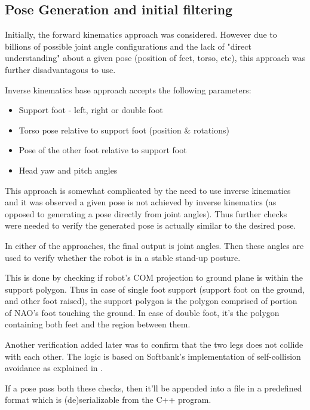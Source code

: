 \documentclass[english, printversion, nomenclature, notitle]{tuvisionthesis} %
\begin{document}
\subsection{Pose Generation and initial filtering}

Initially, the forward kinematics approach was considered. However due to billions of possible joint angle configurations and the lack of "direct understanding" about a given pose (position of feet, torso, etc), this approach was further disadvantagous to use.

Inverse kinematics base approach accepts the following parameters:
\begin{itemize}
	\item Support foot - left, right or double foot
	\item Torso pose relative to support foot (position \& rotations)
	\item Pose of the other foot relative to support foot
	\item Head yaw and pitch angles
\end{itemize}
This approach is somewhat complicated by the need to use inverse kinematics and it was observed a given pose is not achieved by inverse kinematics (as opposed to generating a pose directly from joint angles). Thus further checks were needed to verify the generated pose is actually similar to the desired pose.

In either of the approaches, the final output is joint angles. Then these angles are used to verify whether the robot is in a stable stand-up posture.

This is done by checking if robot's COM projection to ground plane is within the support polygon. Thus in case of single foot support (support foot on the ground, and other foot raised), the support polygon is the polygon comprised of portion of NAO's foot touching the ground. In case of double foot, it's the polygon containing both feet and the region between them. 

Another verification added later was to confirm that the two legs does not collide with each other. The logic is based on Softbank's implementation of self-collision avoidance as explained in .

If a pose pass both these checks, then it'll be appended into a file in a predefined format which is (de)serializable from the C++ program. 
\end{document}
